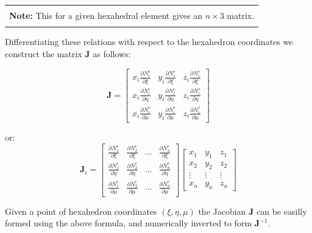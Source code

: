\documentclass[10pt,b5paper,titlepage]{book}
\newenvironment{bbox}[1][0.96]
{
    \begin{center}
        \begin{tabular}{|p{#1\textwidth}|}
            \hline\\
}
{
            \\\\\hline
        \end{tabular}
    \end{center}
}
\begin{document}
\begin{bbox}
    \textbf{Note:} This for a given hexahedral element gives an $ n \times 3 $ matrix.
\end{bbox}


Differentiating these relations with respect to the hexahedron coordinates we construct
the matrix $ \mathbf{J} $ as follows:

\begin{equation}
    \mathbf{J} =
    \begin{bmatrix}
        x_i \frac{\partial N_i^e}{\partial \xi} &
        y_i \frac{\partial N_i^e}{\partial \xi} &
        z_i \frac{\partial N_i^e}{\partial \xi}\\
        x_i \frac{\partial N_i^e}{\partial \eta} &
        y_i \frac{\partial N_i^e}{\partial \eta} &
        z_i \frac{\partial N_i^e}{\partial \eta}\\
        x_i \frac{\partial N_i^e}{\partial \mu} &
        y_i \frac{\partial N_i^e}{\partial \mu} &
        z_i \frac{\partial N_i^e}{\partial \mu}
    \end{bmatrix}
\end{equation}

or:
\begin{equation}
    \mathbf{J}_i =
    \begin{bmatrix}
        \frac{\partial N_1^e}{\partial \xi} &
        \frac{\partial N_2^e}{\partial \xi} &
        \dots &
        \frac{\partial N_n^e}{\partial \xi}\\
        \frac{\partial N_1^e}{\partial \eta} &
        \frac{\partial N_2^e}{\partial \eta} &
        \dots &
        \frac{\partial N_n^e}{\partial \eta}\\
        \frac{\partial N_1^e}{\partial \mu} &
        \frac{\partial N_2^e}{\partial \mu} &
        \dots &
        \frac{\partial N_n^e}{\partial \mu}
    \end{bmatrix}
    \begin{bmatrix}
        x_1 & y_1 & z_1 \\
        x_2 & y_2 & z_2 \\
        \vdots & \vdots & \vdots \\
        x_n & y_n & z_n
    \end{bmatrix}
\end{equation}


Given a point of hexahedron coordinates $ ( \xi, \eta, \mu ) $ the Jacobian $ \mathbf{J} $
can be easilly formed using the above formula, and numerically inverted to form
$ \mathbf{J}^{-1} $.
\end{document}
